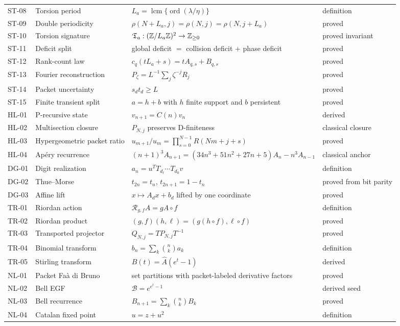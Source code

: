 \documentclass[11pt]{article}
\theoremstyle{definition}\newtheorem{definition}[theorem]{Definition}\newtheorem{example}[theorem]{Example}\newtheorem{construction}[theorem]{Construction}\newtheorem{algorithm}[theorem]{Algorithm}\newtheorem{conjecture}[theorem]{Conjecture}\newtheorem{problem}[theorem]{Problem}
\theoremstyle{remark}\newtheorem{remark}[theorem]{Remark}\newtheorem{boundary}[theorem]{Boundary}\newtheorem{certificate}[theorem]{Computational Certificate}\newtheorem{classical}[theorem]{Classical Input}\newtheorem{principle}[theorem]{Structural Principle}
\begin{document}
\begin{longtable}{L{.08\textwidth}L{.22\textwidth}L{.36\textwidth}L{.12\textwidth}}
ST-08&Torsion period&$L_a=\operatorname{lcm}\{\operatorname{ord}(\lambda/\eta)\}$&definition\\
ST-09&Double periodicity&$\rho(N+L_a,j)=\rho(N,j)=\rho(N,j+L_a)$&proved\\
ST-10&Torsion signature&$\mathfrak T_a:(\mathbb Z/L_a\mathbb Z)^2\to\mathbb Z_{\ge0}$&proved invariant\\
ST-11&Deficit split&global deficit $=$ collision deficit $+$ phase deficit&proved\\
ST-12&Rank-count law&$c_q(tL_a+s)=tA_{q,s}+B_{q,s}$&proved\\
ST-13&Fourier reconstruction&$P_\zeta=L^{-1}\sum_j\zeta^{-j}R_j$&proved\\
ST-14&Packet uncertainty&$s_dt_d\ge L$&proved\\
ST-15&Finite transient split&$a=h+b$ with $h$ finite support and $b$ persistent&proved\\
HL-01&P-recursive state&$v_{n+1}=C(n)v_n$&derived\\
HL-02&Multisection closure&$P_{N,j}$ preserves D-finiteness&classical closure\\
HL-03&Hypergeometric packet ratio&$u_{m+1}/u_m=\prod_{s=0}^{N-1}R(Nm+j+s)$&proved\\
HL-04&Ap\'ery recurrence&$(n+1)^3A_{n+1}=(34n^3+51n^2+27n+5)A_n-n^3A_{n-1}$&classical anchor\\
DG-01&Digit realization&$a_n=u^TT_{d_\ell}\cdots T_{d_0}v$&definition\\
DG-02&Thue--Morse&$t_{2n}=t_n$, $t_{2n+1}=1-t_n$&proved from bit parity\\
DG-03&Affine lift&$x\mapsto A_dx+b_d$ lifted by one coordinate&proved\\
TR-01&Riordan action&$\mathcal R_{g,f}A=gA\circ f$&definition\\
TR-02&Riordan product&$(g,f)(h,\ell)=(g(h\circ f),\ell\circ f)$&proved\\
TR-03&Transported projector&$Q_{N,j}=TP_{N,j}T^{-1}$&proved\\
TR-04&Binomial transform&$b_n=\sum_k\binom nka_k$&definition\\
TR-05&Stirling transform&$\widehat B(t)=\widehat A(e^t-1)$&derived\\
NL-01&Packet Fa\`a di Bruno&set partitions with packet-labeled derivative factors&proved\\
NL-02&Bell EGF&$\mathcal B=e^{e^t-1}$&derived seed\\
NL-03&Bell recurrence&$B_{n+1}=\sum_k\binom nkB_k$&proved\\
NL-04&Catalan fixed point&$u=z+u^2$&definition\\

\end{longtable}
\end{document}
